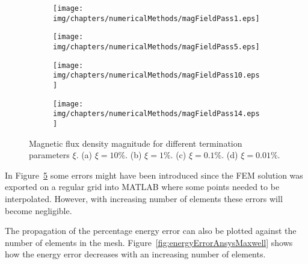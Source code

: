 \begin{figure}[htb]
        \centering
        \begin{subfigure}[b]{0.47\textwidth}
                \texttt{[image: img/chapters/numericalMethods/magFieldPass1.eps]}
                \caption{}
                \label{fig:magFiledPass1}
        \end{subfigure}
        \begin{subfigure}[b]{0.47\textwidth}
                \texttt{[image: img/chapters/numericalMethods/magFieldPass5.eps]}
                \caption{}
                \label{fig:magFieldPass5}
        \end{subfigure}
        \begin{subfigure}[b]{0.47\textwidth}
                \texttt{[image: img/chapters/numericalMethods/magFieldPass10.eps]}
                \caption{}
                \label{fig:magFieldPass10}
        \end{subfigure}
        \begin{subfigure}[b]{0.47\textwidth}
                \texttt{[image: img/chapters/numericalMethods/magFieldPass14.eps]}
                \caption{}
                \label{fig:magFieldPass14}
        \end{subfigure}
        \caption[FEM magnetic flux density result at the magnet's centre plane]{Magnetic flux density magnitude for different termination parameters $\xi$. (a) $\xi=10\%$. (b) $\xi=1\%$. (c) $\xi=0.1\%$. (d) $\xi=0.01\%$.}
        \label{fig:magFieldPass}
\end{figure}


In Figure~\ref{fig:magFieldPass} some errors might have been introduced since the FEM solution was exported on a regular grid into MATLAB where some points needed to be interpolated. However, with increasing number of elements these errors will become negligible. 

The propagation of the percentage energy error can also be plotted against the number of elements in the mesh. Figure~\ref{fig:energyErrorAnsysMaxwell} shows how the energy error decreases with an increasing number of elements. 

